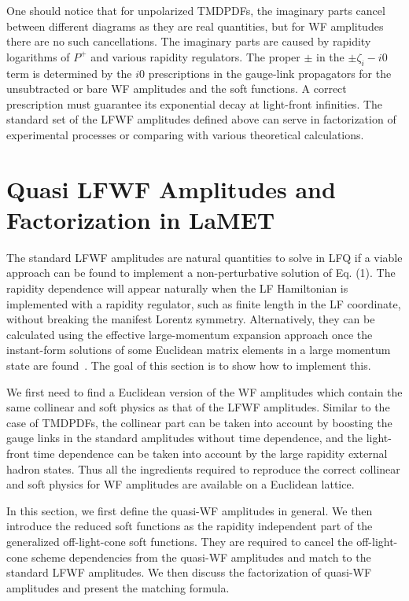 \documentclass[twocolumn,superscriptaddress,longbibliography,10pt]{revtex4-1}
\begin{document}
One should notice that for unpolarized TMDPDFs, the imaginary parts cancel between  different diagrams as they
are real quantities, but for WF amplitudes there are no such cancellations. The imaginary parts are caused by rapidity logarithms of $P^+$ and various rapidity regulators. The proper $\pm$ in the $\pm \zeta_i-i0$ term is determined by the $i0$ prescriptions in the gauge-link propagators for the unsubtracted or bare WF amplitudes and the soft functions. A correct prescription must guarantee its exponential decay at light-front infinities. The standard set of the LFWF amplitudes defined above
can serve in factorization of experimental processes or comparing with various theoretical calculations.

\section{Quasi LFWF Amplitudes and Factorization in LaMET}
\label{sec:LFWF-LFA_LaMET}

The standard LFWF amplitudes are natural quantities to solve
in LFQ if a viable approach can be found to implement a non-perturbative
solution of Eq. (1). The rapidity dependence will appear naturally when the LF Hamiltonian
is implemented with a rapidity regulator, such as finite length in the LF coordinate, without breaking the manifest Lorentz symmetry.
Alternatively, they can be calculated using
the effective large-momentum expansion approach once the instant-form solutions of some Euclidean matrix
elements in a large momentum state are found~\cite{Ji:2020ect}. The goal of this section is to show how to implement this.

We first need to find a Euclidean version of the WF amplitudes which contain
the same collinear and soft physics as that of the LFWF amplitudes.
Similar to the case of TMDPDFs, the collinear part can be taken into account by
boosting the gauge links in the standard amplitudes without time dependence,
and the light-front time dependence can be taken into account by the large rapidity external hadron states. Thus all the ingredients required to reproduce the correct
collinear and soft physics for WF amplitudes are available on a Euclidean lattice.

In this section, we first define the quasi-WF amplitudes in general. We then introduce the reduced soft functions as the rapidity independent part of the generalized off-light-cone soft functions. They are required to cancel the off-light-cone scheme dependencies from the quasi-WF amplitudes and match to the standard LFWF amplitudes. We then discuss the factorization of quasi-WF amplitudes and present the matching formula.
\end{document}
